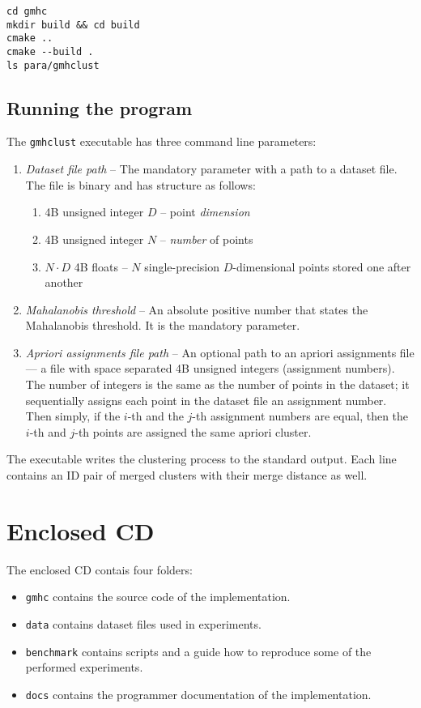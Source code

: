 \documentclass[12pt,a4paper,twoside,openright]{report}
\let\openright=\cleardoublepage
\begin{document}
\begin{lstlisting}
cd gmhc
mkdir build && cd build
cmake ..
cmake --build .
ls para/gmhclust
\end{lstlisting}

\section{Running the program}

The \texttt{gmhclust} executable has three command line parameters:
\begin{enumerate}
	\item \emph{Dataset file path} -- The mandatory parameter with a path to a dataset file. The file is binary and has structure as follows:
	\begin{enumerate}
		\item 4B unsigned integer $D$ -- point \emph{dimension}
		\item 4B unsigned integer $N$ -- \emph{number} of points
		\item $N\cdot D$ 4B floats -- $N$ single-precision $D$-dimensional points stored one after another
	\end{enumerate}
	\item \emph{Mahalanobis threshold} -- An absolute positive number that states the Mahalanobis threshold. It is the mandatory parameter.
	\item \emph{Apriori assignments file path} -- An optional path to an apriori assignments file --- a file with space separated 4B unsigned integers (assignment numbers). The number of integers is the same as the number of points in the dataset; it sequentially assigns each point in the dataset file an assignment number. Then simply, if the $i$-th and the $j$-th assignment numbers are equal, then the $i$-th and $j$-th points are assigned the same apriori cluster. 
\end{enumerate}

The executable writes the clustering process to the standard output. Each line contains an ID pair of merged clusters with their merge distance as well.

\chapter{Enclosed CD}

The enclosed CD contais four folders:

\begin{itemize}
	\item \texttt{gmhc} contains the source code of the implementation.
	\item \texttt{data} contains dataset files used in experiments.
	\item \texttt{benchmark} contains scripts and a guide how to reproduce some of the performed experiments.
	\item \texttt{docs} contains the programmer documentation of the implementation.
\end{itemize} 


\openright
\end{document}

